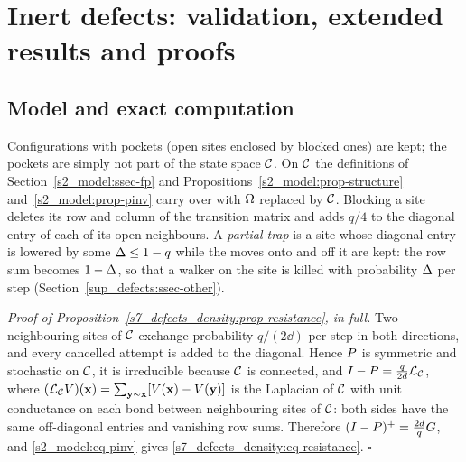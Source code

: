 \section{Inert defects: validation, extended results and proofs}\label{sup_defects:sec}

\subsection{Model and exact computation}\label{sup_defects:ssec-validation}

Configurations with pockets (open sites enclosed by blocked ones) are kept; the pockets are simply not part of the state
space $\mathcal{C}$. On $\mathcal{C}$ the definitions of Section~\ref{s2_model:ssec-fp} and Propositions~\ref{s2_model:prop-structure}
and~\ref{s2_model:prop-pinv} carry over with $\Omega$ replaced by $\mathcal{C}$. Blocking a site deletes its row and column of the
transition matrix and adds $q/4$ to the diagonal entry of each of its open neighbours. A \emph{partial trap} is a site
whose diagonal entry is lowered by some $\Delta\le1-q$ while the moves onto and off it are kept: the row sum becomes
$1-\Delta$, so that a walker on the site is killed with probability $\Delta$ per step
(Section~\ref{sup_defects:ssec-other}).

\emph{Proof of Proposition~\ref{s7_defects_density:prop-resistance}, in full.} Two neighbouring sites of $\mathcal{C}$ exchange
probability $q/(2\dd)$ per step in both directions, and every cancelled attempt is added to the diagonal. Hence $P$ is
symmetric and stochastic on $\mathcal{C}$, it is irreducible because $\mathcal{C}$ is connected, and $I-P=\frac{q}{2d}\mathcal{L}_{\mathcal{C}}$,
where $(\mathcal{L}_{\mathcal{C}}V)(\mathbf{x})=\sum_{\mathbf{y}\sim\mathbf{x}}[V(\mathbf{x})-V(\mathbf{y})]$ is the Laplacian of $\mathcal{C}$ with unit conductance on each bond
between neighbouring sites of $\mathcal{C}$: both sides have the same off-diagonal entries and vanishing row sums. Therefore
$(I-P)^{+}=\frac{2d}{q}G$, and \eqref{s2_model:eq-pinv} gives \eqref{s7_defects_density:eq-resistance}.
\hfill$\square$

